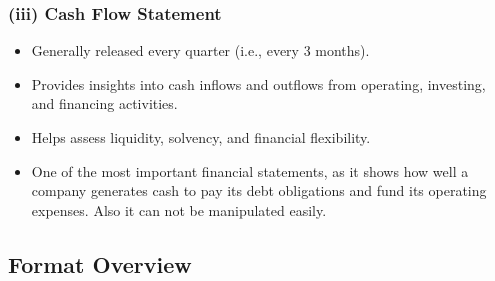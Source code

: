 \documentclass[12pt]{article}
\begin{document}
\subsubsection*{(iii) Cash Flow Statement}
\begin{itemize}
    \item Generally released every quarter (i.e., every 3 months).
    \item Provides insights into cash inflows and outflows from operating, investing, and financing activities.
    \item Helps assess liquidity, solvency, and financial flexibility.
    \item One of the most important financial statements, as it shows how well a company generates cash to pay its debt obligations and fund its operating expenses. Also it can not be manipulated easily.
\end{itemize}


\subsection*{Format Overview}

\renewcommand{\arraystretch}{1.5}
\setlength{\tabcolsep}{6pt}
\end{document}
